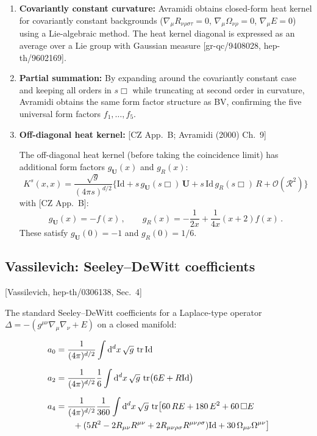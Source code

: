 \documentclass[12pt,a4paper]{article}
\theoremstyle{definition}
\theoremstyle{remark}
\newcommand{\tr}{\operatorname{tr}}
\newcommand{\Rsq}{R_{\mu\nu\rho\sigma}R^{\mu\nu\rho\sigma}}
\newcommand{\Ricsq}{R_{\mu\nu}R^{\mu\nu}}
\newcommand{\dd}{\mathrm{d}}
\newcommand{\Id}{\mathrm{Id}}
\newcommand{\fromlit}[1]{\textcolor{blue!70!black}{\textsf{[#1]}}}
\begin{document}
\begin{enumerate}
\item \textbf{Covariantly constant curvature:}
Avramidi obtains closed-form heat kernel for covariantly constant
backgrounds ($\nabla_\mu R_{\nu\rho\sigma\tau} = 0$,
$\nabla_\mu\Omega_{\nu\rho} = 0$, $\nabla_\mu E = 0$)
using a Lie-algebraic method.  The heat kernel diagonal is expressed
as an average over a Lie group with Gaussian measure
\fromlit{gr-qc/9408028, hep-th/9602169}.

\item \textbf{Partial summation:}
By expanding around the covariantly constant case and keeping
all orders in $s\Box$ while truncating at second order in curvature,
Avramidi obtains the same form factor structure as BV, confirming
the five universal form factors $f_1,\ldots,f_5$.

\item \textbf{Off-diagonal heat kernel:}
\fromlit{CZ App.~B; Avramidi (2000) Ch.~9}

The off-diagonal heat kernel (before taking the coincidence limit)
has additional form factors $g_{\mathbf{U}}(x)$ and $g_R(x)$:
\begin{equation}
  K^s(x,x) = \frac{\sqrt{g}}{(4\pi s)^{d/2}}\bigl\{
  \Id + s\,g_{\mathbf{U}}(s\Box)\,\mathbf{U}
  + s\,\Id\,g_R(s\Box)\,R
  + \mathcal{O}(\mathcal{R}^2)\bigr\}
  \label{eq:offdiag-hk}
\end{equation}
with \fromlit{CZ App.~B}:
\begin{equation}
  g_{\mathbf{U}}(x) = -f(x)\,,
  \qquad
  g_R(x) = -\frac{1}{2x} + \frac{1}{4x}(x+2)f(x)\,.
  \label{eq:offdiag-ff}
\end{equation}
These satisfy $g_{\mathbf{U}}(0) = -1$ and $g_R(0) = 1/6$.
\end{enumerate}


\subsection{Vassilevich: Seeley--DeWitt coefficients}

\fromlit{Vassilevich, hep-th/0306138, Sec.~4}

The standard Seeley--DeWitt coefficients for a Laplace-type operator
$\Delta = -(g^{\mu\nu}\nabla_\mu\nabla_\nu + E)$ on a closed manifold:

\begin{align}
  a_0 &= \frac{1}{(4\pi)^{d/2}}\int\dd^d x\,\sqrt{g}\,\tr\Id
  \label{eq:a0-V}\\[6pt]
  a_2 &= \frac{1}{(4\pi)^{d/2}}\frac{1}{6}
  \int\dd^d x\,\sqrt{g}\,\tr\bigl(6E + R\Id\bigr)
  \label{eq:a2-V}\\[6pt]
  a_4 &= \frac{1}{(4\pi)^{d/2}}\frac{1}{360}
  \int\dd^d x\,\sqrt{g}\,\tr\bigl[
  60\,RE + 180\,E^2 + 60\,\Box E
  \notag\\
  &\qquad + (5R^2 - 2\Ricsq + 2\Rsq)\Id
  + 30\,\Omega_{\mu\nu}\Omega^{\mu\nu}
  \bigr]
  \label{eq:a4-V}
\end{align}
\end{document}
